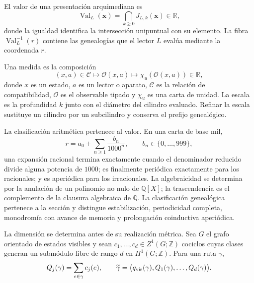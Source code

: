 \begin{definition}[Valor]
El valor de una presentación arquimediana es
\begin{equation}
 \operatorname{Val}_L(\boldsymbol x)
 =\bigcap_{k\geq0}J_{L,k}(\boldsymbol x)\in\mathbb R,
 \label{eq:definicion-valor}
\end{equation}
donde la igualdad identifica la intersección unipuntual con su elemento.
La fibra \(\operatorname{Val}_L^{-1}(r)\) contiene las genealogías que el
lector \(L\) evalúa mediante la coordenada \(r\).
\end{definition}

\begin{definition}
Una medida es la composición
\begin{equation}
 (x,a)\in\mathcal C
 \longmapsto\mathcal O(x,a)
 \longmapsto\chi_u(\mathcal O(x,a))\in\mathbb R,
 \label{eq:definicion-medida}
\end{equation}
donde \(x\) es un estado, \(a\) es un lector o aparato,
\(\mathcal C\) es la relación de compatibilidad,
\(\mathcal O\) es el observable tipado y \(\chi_u\) es una carta de unidad.
La escala es la profundidad \(k\) junto con el diámetro del cilindro
evaluado. Refinar la escala sustituye un cilindro por un subcilindro y
conserva el prefijo genealógico.
\end{definition}

La clasificación aritmética pertenece al valor. En una carta de base mil,
\begin{equation}
 r=a_0+\sum_{n\geq1}\frac{b_n}{1000^n},
 \qquad b_n\in\{0,\ldots,999\},
 \label{eq:expansion-base-mil-clasificacion}
\end{equation}
una expansión racional termina exactamente cuando el denominador reducido
divide alguna potencia de \(1000\); es finalmente periódica exactamente
para los racionales; y es aperiódica para los irracionales. La algebraicidad
se determina por la anulación de un polinomio no nulo de
\(\mathbb Q[X]\); la trascendencia es el complemento de la clausura
algebraica de \(\mathbb Q\). La clasificación genealógica pertenece a la
sección y distingue estabilización, periodicidad completa, monodromía con
avance de memoria y prolongación coinductiva aperiódica.

La dimensión se determina antes de su realización métrica. Sea \(G\) el
grafo orientado de estados visibles y sean
\(c_1,\ldots,c_d\in Z^1(G;\mathbb Z)\) cociclos cuyas clases generan un
submódulo libre de rango \(d\) en \(H^1(G;\mathbb Z)\). Para una ruta
\(\gamma\),
\begin{equation}
 Q_j(\gamma)=\sum_{e\in\gamma}c_j(e),
 \qquad
 \widetilde\gamma=
 \bigl(q_{\rm vis}(\gamma),Q_1(\gamma),\ldots,Q_d(\gamma)\bigr).
 \label{eq:levantamiento-cohomologico-dimension}
\end{equation}

